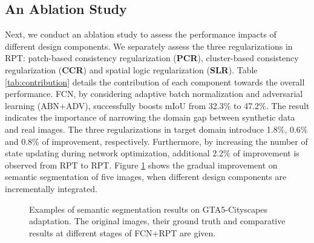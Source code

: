 \documentclass[10pt,twocolumn,letterpaper]{article}
\begin{document}
\subsection{An Ablation Study}
Next, we conduct an ablation study to assess the performance impacts of different design components. We separately assess the three regularizations in RPT: patch-based consistency regularization (\textbf{PCR}), cluster-based consistency regularization (\textbf{CCR}) and spatial logic regularization (\textbf{SLR}). Table \ref{tab:contribution} details the contribution of each component towards the overall performance. FCN, by considering adaptive batch normalization and adversarial learning (ABN+ADV), successfully boosts mIoU from 32.3\% to 47.2\%. The result indicates the importance of narrowing the domain gap between synthetic data and real images. The three regularizations in target domain introduce 1.8\%, 0.6\% and 0.8\% of improvement, respectively. Furthermore, by increasing the number of state updating during network optimization, additional 2.2\% of improvement is observed from RPT to RPT. Figure \ref{fig:comparison} shows the gradual improvement on semantic segmentation of five images, when different design components are incrementally integrated.

\begin{figure}[!tb]
   \caption{\small Examples of semantic segmentation results on GTA5-Cityscapes adaptation. The original images, their ground truth and comparative results at different stages of FCN+RPT are given.}
   \label{fig:comparison}
   \vspace{-0.15in}
\end{figure}
\end{document}
